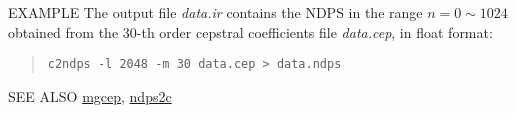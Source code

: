 \begin{options}
\end{options}

\begin{qsection}{EXAMPLE}
The output file {\em data.ir} contains the NDPS
in the range $n = 0 \sim 1024$ obtained from the 30-th order cepstral
coefficients file {\em data.cep}, in float format:
 \begin{quote}
  \verb!c2ndps -l 2048 -m 30 data.cep > data.ndps!
 \end{quote}
\end{qsection}

\begin{qsection}{SEE ALSO}
\hyperlink{mgcep}{mgcep},
\hyperlink{ndps2c}{ndps2c}
\end{qsection}
